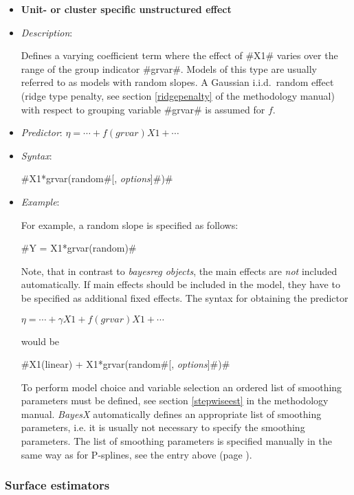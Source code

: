 \begin{itemize}
\item[]{\bf\sffamily Unit- or cluster specific unstructured
effect}

\item[] {\em Description}:

Defines a varying coefficient term where the effect of #X1# varies
over the range of the group indicator #grvar#. Models of this type
are usually referred to as models with random slopes. A Gaussian
i.i.d.~random effect (ridge type penalty, see section \autoref{ridgepenalty}
of the methodology manual)  with respect to grouping variable #grvar# is
assumed for $f$.
\item[] {\em Predictor}: $\eta = \cdots + f(grvar)X1 + \cdots$
\item[] {\em Syntax}:

#X1*grvar(random#[, {\em options}]#)#
\item[] {\em Example}:

For example, a random slope is specified as follows:

#Y = X1*grvar(random)#

Note, that in contrast to {\em bayesreg objects}, the main effects
are {\em not} included automatically. If main effects should be
included in the model, they have to be specified as additional
fixed effects. The syntax for obtaining the predictor

$\eta = \cdots + \gamma X1 + f(grvar)X1 + \cdots$

would be

#X1(linear) + X1*grvar(random#[, {\em options}]#)#

To perform model choice and variable selection an ordered list of smoothing parameters
must be defined, see section \autoref{stepwiseest}
in the methodology manual. {\em BayesX} automatically defines an appropriate list of smoothing parameters, i.e. it
is usually not necessary to  specify the smoothing parameters.
The list of smoothing parameters is specified manually in the same way as for P-splines,
see the entry above (page \pageref{psplines_stepwise}).
\end{itemize}

\subsubsection*{Surface estimators}


